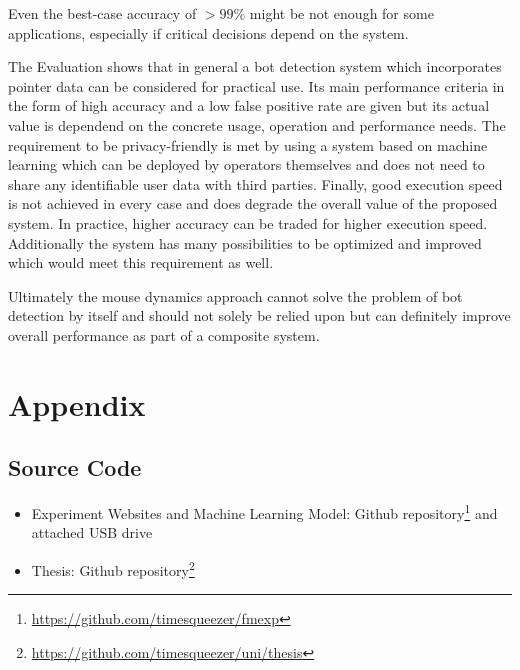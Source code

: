 \documentclass[
    fontsize=12pt,
    headings=small,
    parskip=half,           %
    bibliography=totoc,
    numbers=noenddot,       %
    open=any,               %
    final,                   %
    table
]{scrreprt}
\begin{document}
Even the best-case accuracy of $>99\%$ might be not enough for some applications, especially if critical decisions depend on the system.

The Evaluation shows that in general a bot detection system which incorporates pointer data can be considered for practical use. Its main performance criteria in the form of high accuracy and a low false positive rate are given but its actual value is dependend on the concrete usage, operation and performance needs. The requirement to be privacy-friendly is met by using a system based on machine learning which can be deployed by operators themselves and does not need to share any identifiable user data with third parties. Finally, good execution speed is not achieved in every case and does degrade the overall value of the proposed system. In practice, higher accuracy can be traded for higher execution speed. Additionally the system has many possibilities to be optimized and improved which would meet this requirement as well.

Ultimately the mouse dynamics approach cannot solve the problem of bot detection by itself and should not solely be relied upon but can definitely improve overall performance as part of a composite system.

\begin{raggedright}
  \printbibliography
\end{raggedright}

\chapter*{Appendix}

\section*{Source Code}

\begin{itemize}
    \item Experiment Websites and Machine Learning Model: Github repository\footnote{\url{https://github.com/timesqueezer/fmexp}} and attached USB drive
    \item Thesis: Github repository\footnote{\url{https://github.com/timesqueezer/uni/thesis}}
\end{itemize}
\end{document}
